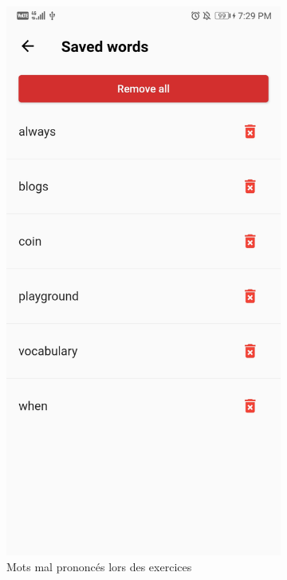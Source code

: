 \begin{appendices}
\begin{landscape}
\begin{figure}[h]
\begin{subfigure}{.25\textwidth}
    \includegraphics[width=.75\linewidth]{content/imgs/screen10.jpg}
    \caption{Mots mal prononcés lors des exercices}
  \end{subfigure}%
  \begin{subfigure}{.25\textwidth}
    \centering

\end{subfigure}
\end{figure}
\end{landscape}
\end{appendices}
